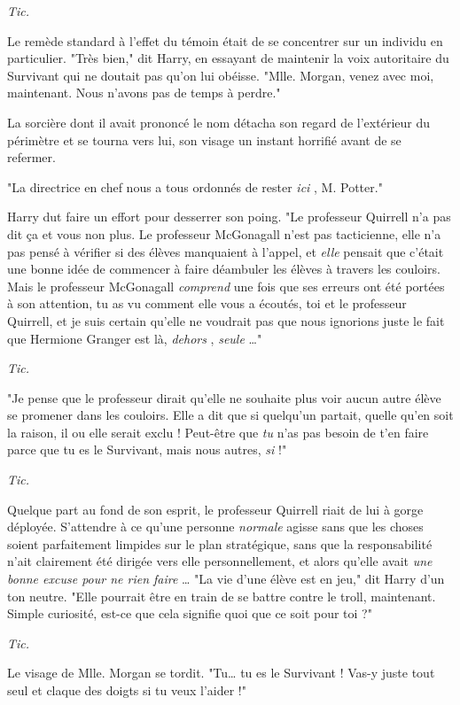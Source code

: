 \emph{Tic.} 

Le remède standard à l'effet du témoin était de se concentrer sur un individu en particulier. "Très bien," dit Harry, en essayant de maintenir la voix autoritaire du Survivant qui ne doutait pas qu'on lui obéisse. "Mlle. Morgan, venez avec moi, maintenant. Nous n'avons pas de temps à perdre."

La sorcière dont il avait prononcé le nom détacha son regard de l'extérieur du périmètre et se tourna vers lui, son visage un instant horrifié avant de se refermer.

"La directrice en chef nous a tous ordonnés de rester \emph{ici} , M. Potter."

Harry dut faire un effort pour desserrer son poing. "Le professeur Quirrell n'a pas dit ça et vous non plus. Le professeur McGonagall n'est pas tacticienne, elle n'a pas pensé à vérifier si des élèves manquaient à l'appel, et \emph{elle}  pensait que c'était une bonne idée de commencer à faire déambuler les élèves à travers les couloirs. Mais le professeur McGonagall \emph{comprend}  une fois que ses erreurs ont été portées à son attention, tu as vu comment elle vous a écoutés, toi et le professeur Quirrell, et je suis certain qu'elle ne voudrait pas que nous ignorions juste le fait que Hermione Granger est là, \emph{dehors} , \emph{seule} …"

\emph{Tic.} 

"Je pense que le professeur dirait qu'elle ne souhaite plus voir aucun autre élève se promener dans les couloirs. Elle a dit que si quelqu'un partait, quelle qu'en soit la raison, il ou elle serait exclu ! Peut-être que \emph{tu}  n'as pas besoin de t'en faire parce que tu es le Survivant, mais nous autres, \emph{si}  !"

\emph{Tic.} 

Quelque part au fond de son esprit, le professeur Quirrell riait de lui à gorge déployée. S'attendre à ce qu'une personne \emph{normale}  agisse sans que les choses soient parfaitement limpides sur le plan stratégique, sans que la responsabilité n'ait clairement été dirigée vers elle personnellement, et alors qu'elle avait \emph{une bonne excuse pour ne rien faire} … "La vie d'une élève est en jeu," dit Harry d'un ton neutre. "Elle pourrait être en train de se battre contre le troll, maintenant. Simple curiosité, est-ce que cela signifie quoi que ce soit pour toi ?"

\emph{Tic.} 

Le visage de Mlle. Morgan se tordit. "Tu… tu es le Survivant ! Vas-y juste tout seul et claque des doigts si tu veux l'aider !"

